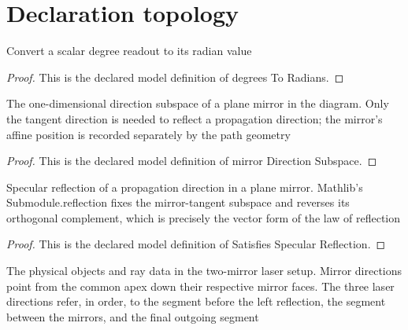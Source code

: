 \section{Declaration topology}
\begin{definition}
  \label{def:physics:phyx-mini-0069:phyxminiproblems-problemphyxmini0069-degreestoradians}
  Convert a scalar degree readout to its radian value
\end{definition}
\begin{proof}
  This is the declared model definition of degrees To Radians.
\end{proof}
\begin{definition}
  \label{def:physics:phyx-mini-0069:phyxminiproblems-problemphyxmini0069-mirrordirectionsubspace}
  The one-dimensional direction subspace of a plane mirror in the diagram. Only the tangent direction is needed to reflect a propagation direction; the mirror's affine position is recorded separately by the path geometry
\end{definition}
\begin{proof}
  This is the declared model definition of mirror Direction Subspace.
\end{proof}
\begin{definition}
  \label{def:physics:phyx-mini-0069:phyxminiproblems-problemphyxmini0069-satisfiesspecularreflection}
  Specular reflection of a propagation direction in a plane mirror. Mathlib's Submodule.reflection fixes the mirror-tangent subspace and reverses its orthogonal complement, which is precisely the vector form of the law of reflection
\end{definition}
\begin{proof}
  This is the declared model definition of Satisfies Specular Reflection.
\end{proof}
\begin{definition}
  \label{def:physics:phyx-mini-0069:phyxminiproblems-problemphyxmini0069-twomirrorlasersetup}
  The physical objects and ray data in the two-mirror laser setup. Mirror directions point from the common apex down their respective mirror faces. The three laser directions refer, in order, to the segment before the left reflection, the segment between the mirrors, and the final outgoing segment
\end{definition}
